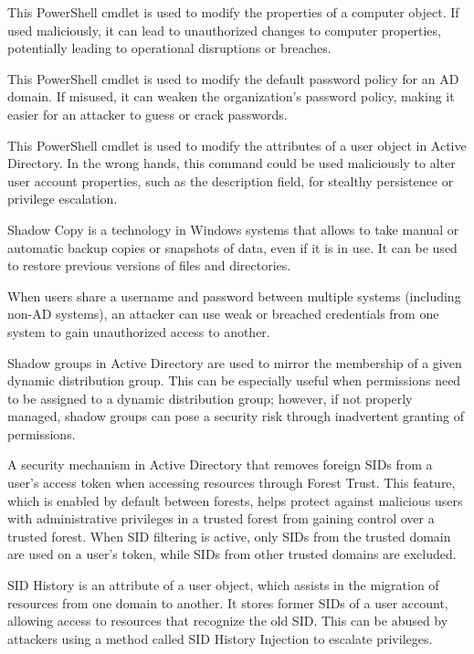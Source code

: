  This PowerShell cmdlet is used to modify the properties of a computer object. If used maliciously, it can lead to unauthorized changes to computer properties, potentially leading to operational disruptions or breaches.

 This PowerShell cmdlet is used to modify the default password policy for an AD domain. If misused, it can weaken the organization’s password policy, making it easier for an attacker to guess or crack passwords.

 This PowerShell cmdlet is used to modify the attributes of a user object in Active Directory. In the wrong hands, this command could be used maliciously to alter user account properties, such as the description field, for stealthy persistence or privilege escalation.

 Shadow Copy is a technology in Windows systems that allows to take manual or automatic backup copies or snapshots of data, even if it is in use. It can be used to restore previous versions of files and directories.

 When users share a username and password between multiple systems (including non-AD systems), an attacker can use weak or breached credentials from one system to gain unauthorized access to another.

 Shadow groups in Active Directory are used to mirror the membership of a given dynamic distribution group. This can be especially useful when permissions need to be assigned to a dynamic distribution group; however, if not properly managed, shadow groups can pose a security risk through inadvertent granting of permissions.

 A security mechanism in Active Directory that removes foreign SIDs from a user’s access token when accessing resources through Forest Trust. This feature, which is enabled by default between forests, helps protect against malicious users with administrative privileges in a trusted forest from gaining control over a trusted forest. When SID filtering is active, only SIDs from the trusted domain are used on a user's token, while SIDs from other trusted domains are excluded.

 SID History is an attribute of a user object, which assists in the migration of resources from one domain to another. It stores former SIDs of a user account, allowing access to resources that recognize the old SID. This can be abused by attackers using a method called SID History Injection to escalate privileges.

